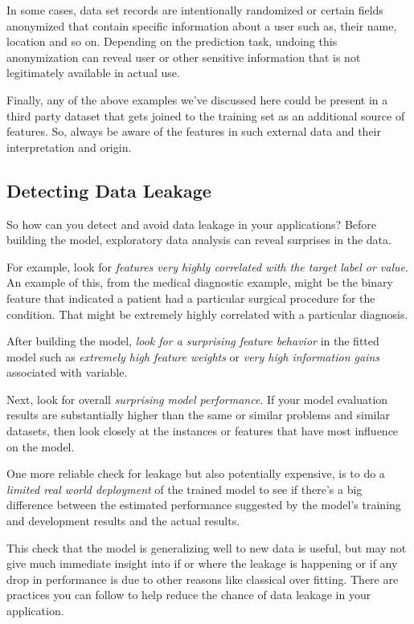 \begin{multicols}{2}
In some cases, data set records are intentionally randomized or certain fields anonymized that contain specific information about a user such as, their name, location and so on. Depending on the prediction task, undoing this anonymization can reveal user or other sensitive information that is not legitimately available in actual use. 

Finally, any of the above examples we've discussed here could be present in a third party dataset that gets joined to the training set as an additional source of features. So, always be aware of the features in such external data and their interpretation and origin. 

\subsection{Detecting Data Leakage}

So how can you detect and avoid data leakage in your applications? Before building the model, exploratory data analysis can reveal surprises in the data. 

For example, look for \emph{features very highly correlated with the target label or value}. An example of this, from the medical diagnostic example, might be the binary feature that indicated a patient had a particular surgical procedure for the condition. That might be extremely highly correlated with a particular diagnosis. 

After building the model, \emph{look for a surprising feature behavior} in the fitted model such as \emph{extremely high feature weights} or \emph{very high information gains} associated with variable. 

Next, look for overall \emph{surprising model performance}. If your model evaluation results are substantially higher than the same or similar problems and similar datasets, then look closely at the instances or features that have most influence on the model. 

One more reliable check for leakage but also potentially expensive, is to do a \emph{limited real world deployment} of the trained model to see if there's a big difference between the estimated performance suggested by the model's training and development results and the actual results. 

This check that the model is generalizing well to new data is useful, but may not give much immediate insight into if or where the leakage is happening or if any drop in performance is due to other reasons like classical over fitting. There are practices you can follow to help reduce the chance of data leakage in your application. 


\end{multicols}
